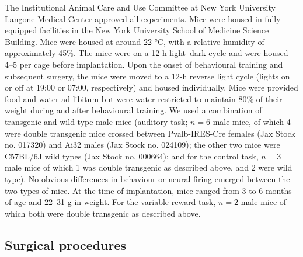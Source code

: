 The Institutional Animal Care and Use Committee at New York University Langone Medical Center approved all experiments. Mice were housed in fully equipped facilities in the New York University School of Medicine Science Building. Mice were housed at around 22 °C, with a relative humidity of approximately 45\%. The mice were on a 12-h light--dark cycle and were housed 4--5 per cage before implantation. Upon the onset of behavioural training and subsequent surgery, the mice were moved to a 12-h reverse light cycle (lights on or off at 19:00 or 07:00, respectively) and housed individually. Mice were provided food and water ad libitum but were water restricted to maintain 80\% of their weight during and after behavioural training. We used a combination of transgenic and wild-type male mice (auditory task; $n = 6$ male mice, of which 4 were double transgenic mice crossed between Pvalb-IRES-Cre females (Jax Stock no. 017320) and Ai32 males (Jax Stock no. 024109); the other two mice were C57BL/6J wild types (Jax Stock no. 000664); and for the control task, $n = 3$ male mice of which 1 was double transgenic as described above, and 2 were wild type). No obvious differences in behaviour or neural firing emerged between the two types of mice. At the time of implantation, mice ranged from 3 to 6 months of age and 22--31 g in weight. For the variable reward task, $n = 2$ male mice of which both were double transgenic as described above.

\subsection{Surgical procedures}

